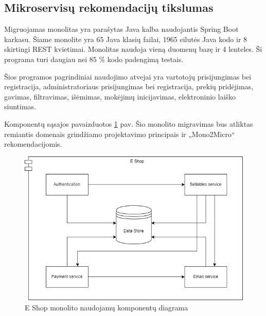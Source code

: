 \documentclass{VUMIFPSbakalaurinis}
\begin{document}

\subsection{Mikroservisų rekomendacijų tikslumas}
Migruojamas monolitas yra parašytas Java kalba naudojantis Spring Boot karkasu. Šiame monolite yra 65 Java klasių failai, 1965 eilutės Java kodo ir 8 skirtingi REST kvietimai. Monolitas naudoja vieną duomenų bazę ir 4 lenteles. Ši programa turi daugiau nei 85 \% kodo padengimą testais.

Šios programos pagrindiniai naudojimo atvejai yra vartotojų prisijungimas bei registracija, administratoriaus prisijungimas bei registracija, prekių pridėjimas, gavimas, filtravimas, išėmimas, mokėjimų inicijavimas, elektroninio laiško siuntimas.

Komponentų sąsajos pavaizduotos \ref{img:e-shop-komponentai} pav. Šio monolito migravimas bus atliktas remiantis domenais grindžiamo projektavimo principais ir „Mono2Micro“ rekomendacijomis.

\begin{figure}[H]
    \centering
    \includegraphics[scale=0.6]{img/komponentu diagrama.drawio.png}
    \caption{E Shop monolito naudojamų komponentų diagrama}
    \label{img:e-shop-komponentai}
\end{figure}
\end{document}
